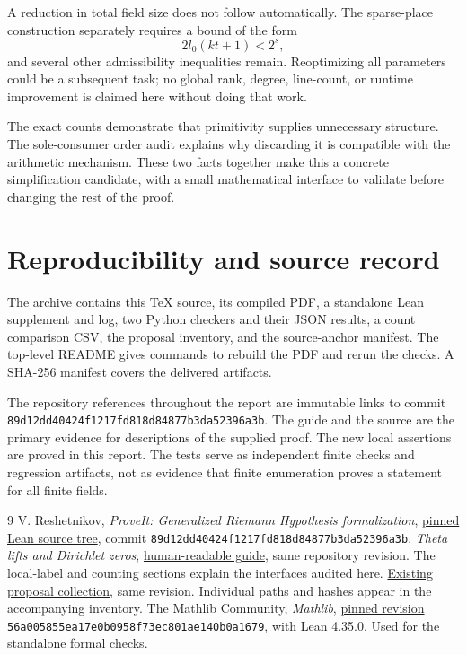 \documentclass[11pt,a4paper]{article}
\theoremstyle{definition}
\theoremstyle{remark}
\newcommand{\code}[1]{{\small\nolinkurl{#1}}}
\newcommand{\guide}{\href{https://github.com/VladimirReshetnikov/ProveIt/blob/89d12dd40424f1217fd818d84877b3da52396a3b/Analysis/GeneralizedRiemannHypothesis/docs/guide/theta_lifts_and_dirichlet_zeros.tex}{human-readable guide}}
\begin{document}
A reduction in total field size does not follow automatically. The sparse-place
construction separately requires a bound of the form
\[
                          2l_0(kt+1)<2^s,
\]
and several other admissibility inequalities remain. Reoptimizing all parameters
could be a subsequent task; no global rank, degree, line-count, or runtime
improvement is claimed here without doing that work.

The exact counts demonstrate that primitivity supplies unnecessary structure.
The sole-consumer order audit explains why discarding it is compatible with the
arithmetic mechanism. These two facts together make this a concrete simplification
candidate, with a small mathematical interface to validate before changing the
rest of the proof.

\appendix
\section{Reproducibility and source record}

The archive contains this \TeX{} source, its compiled PDF, a standalone Lean
supplement and log, two Python checkers and their JSON results, a count comparison
CSV, the proposal inventory, and the source-anchor manifest.
The top-level README gives commands to rebuild the PDF and rerun the checks.
A SHA-256 manifest covers the delivered artifacts.

The repository references throughout the report are immutable links to commit
\code{89d12dd40424f1217fd818d84877b3da52396a3b}.
The guide and the source are the primary evidence for descriptions of the supplied
proof. The new local assertions are proved in this report. The tests serve as
independent finite checks and regression artifacts, not as evidence that finite
enumeration proves a statement for all finite fields.

\begin{thebibliography}{9}
V. Reshetnikov, \emph{ProveIt: Generalized Riemann Hypothesis formalization},
\href{https://github.com/VladimirReshetnikov/ProveIt/tree/89d12dd40424f1217fd818d84877b3da52396a3b/Analysis/GeneralizedRiemannHypothesis/Lean/grh}{pinned Lean source tree},
commit \code{89d12dd40424f1217fd818d84877b3da52396a3b}.
\emph{Theta lifts and Dirichlet zeros}, \guide{}, same repository revision.
The local-label and counting sections explain the interfaces audited here.
\href{https://github.com/VladimirReshetnikov/ProveIt/tree/89d12dd40424f1217fd818d84877b3da52396a3b/Analysis/GeneralizedRiemannHypothesis/docs/proposals}{Existing proposal collection}, same revision.
Individual paths and hashes appear in the accompanying inventory.
The Mathlib Community, \emph{Mathlib},
\href{https://github.com/leanprover-community/mathlib4/tree/56a005855ea17e0b0958f73ec801ae140b0a1679}{pinned revision}
\code{56a005855ea17e0b0958f73ec801ae140b0a1679},
with Lean 4.35.0. Used for the standalone formal checks.
\end{thebibliography}
\end{document}
